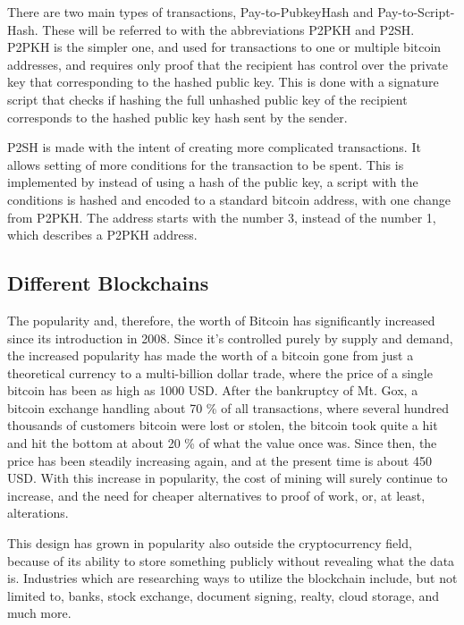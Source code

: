 \documentclass[11pt]{article}
\begin{document}
There are two main types of transactions, Pay-to-PubkeyHash and Pay-to-Script-Hash. These will be referred to with the abbreviations P2PKH and P2SH. P2PKH is the simpler one, and used for transactions to one or multiple bitcoin addresses, and requires only proof that the recipient has control over the private key that corresponding to the hashed public key. This is done with a signature script that checks if hashing the full unhashed public key of the recipient corresponds to the hashed public key hash sent by the sender.

P2SH is made with the intent of creating more complicated transactions. It allows setting of more conditions for the transaction to be spent. This is implemented by instead of using a hash of the public key, a script with the conditions is hashed and encoded to a standard bitcoin address, with one change from P2PKH. The address starts with the number 3, instead of the number 1, which describes a P2PKH address. 
\subsection{Different Blockchains}

The popularity and, therefore, the worth of Bitcoin has significantly increased since its introduction in 2008. Since it's controlled purely by supply and demand, the increased popularity has made the worth of a bitcoin gone from just a theoretical currency to a multi-billion dollar trade, where the price of a single bitcoin has been as high as 1000 USD. After the bankruptcy of Mt. Gox, a bitcoin exchange handling about 70 \% of all transactions, where several hundred thousands of customers bitcoin were lost or stolen, the bitcoin took quite a hit and hit the bottom at about 20 \% of what the value once was. Since then, the price has been steadily increasing again, and at the present time is about 450 USD. With this increase in popularity, the cost of mining will surely continue to increase, and the need for cheaper alternatives to proof of work, or, at least, alterations.  

This design has grown in popularity also outside the cryptocurrency field, because of its ability to store something publicly without revealing what the data is. Industries which are researching ways to utilize the blockchain include, but not limited to, banks, stock exchange, document signing, realty, cloud storage, and much more. 
\end{document}
